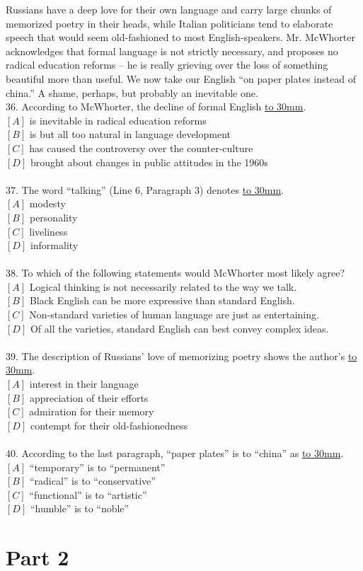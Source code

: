 \documentclass[a4paper]{article}
\begin{document}
\par
Russians have a deep love for their own language and carry large chunks of memorized poetry in their heads, while Italian politicians tend to elaborate speech that would seem old-fashioned to most English-speakers. Mr. McWhorter acknowledges that formal language is not strictly necessary, and proposes no radical education reforms -- he is really grieving over the loss of something beautiful more than useful. We now take our English “on paper plates instead of china.” A shame, perhaps, but probably an inevitable one.
\\36.	According to McWhorter, the decline of formal English \underline{\hbox to 30mm{}}.\\$[A]$ is inevitable in radical education reforms\\$[B]$ is but all too natural in language development\\$[C]$ has caused the controversy over the counter-culture\\$[D]$ brought about changes in public attitudes in the 1960s\\\\37.	The word “talking” (Line 6, Paragraph 3) denotes \underline{\hbox to 30mm{}}.\\$[A]$ modesty\\$[B]$ personality\\$[C]$ liveliness\\$[D]$ informality\\\\38.	To which of the following statements would McWhorter most likely agree?\\$[A]$ Logical thinking is not necessarily related to the way we talk.\\$[B]$ Black English can be more expressive than standard English.\\$[C]$ Non-standard varieties of human language are just as entertaining.\\$[D]$ Of all the varieties, standard English can best convey complex ideas.\\\\39.	The description of Russians’ love of memorizing poetry shows the author’s \underline{\hbox to 30mm{}}.\\$[A]$ interest in their language\\$[B]$ appreciation of their efforts\\$[C]$ admiration for their memory\\$[D]$ contempt for their old-fashionedness\\\\40.	According to the last paragraph, “paper plates” is to “china” as \underline{\hbox to 30mm{}}.\\$[A]$ “temporary” is to “permanent”\\$[B]$ “radical” is to “conservative”\\$[C]$ “functional” is to “artistic”\\$[D]$ “humble” is to “noble”\\\section{Part 2}
\end{document}
